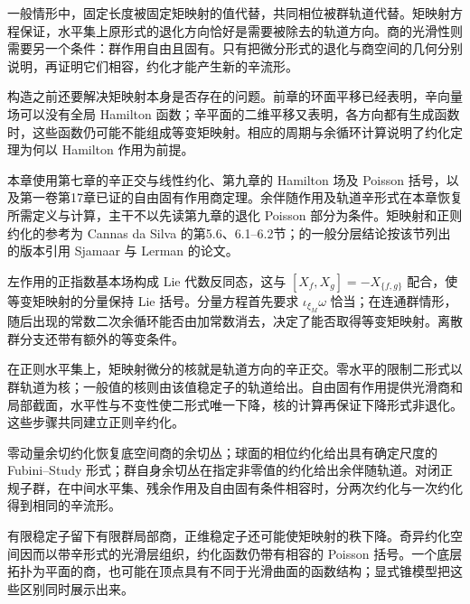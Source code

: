 \ProseParagraphBreak

一般情形中，固定长度被固定矩映射的值代替，共同相位被群轨道代替。矩映射方程保证，水平集上原形式的退化方向恰好是需要被除去的轨道方向。商的光滑性则需要另一个条件：群作用自由且固有。只有把微分形式的退化与商空间的几何分别说明，再证明它们相容，约化才能产生新的辛流形。

\ProseParagraphBreak

构造之前还要解决矩映射本身是否存在的问题。前章的环面平移已经表明，辛向量场可以没有全局 Hamilton 函数；辛平面的二维平移又表明，各方向都有生成函数时，这些函数仍可能不能组成等变矩映射。相应的周期与余循环计算说明了约化定理为何以 Hamilton 作用为前提。

\ProseParagraphBreak

本章使用第七章的辛正交与线性约化、第九章的 Hamilton 场及 Poisson 括号，以及第一卷第17章已证的自由固有作用商定理。余伴随作用及轨道辛形式在本章恢复所需定义与计算，主干不以先读第九章的退化 Poisson 部分为条件。矩映射和正则约化的参考为 Cannas da Silva 的第5.6、6.1–6.2节；的一般分层结论按该节列出的版本引用 Sjamaar 与 Lerman 的论文。\cite[第153--157、160--165页]{Cannas2006Symplectic}






\begin{chaptersummary}
左作用的正指数基本场构成 Lie 代数反同态，这与 \([X_f,X_g]=-X_{\{f,g\}}\) 配合，使等变矩映射的分量保持 Lie 括号。分量方程首先要求 \(\iota_{\xi_M}\omega\) 恰当；在连通群情形，随后出现的常数二次余循环能否由加常数消去，决定了能否取得等变矩映射。离散群分支还带有额外的等变条件。

\ProseParagraphBreak

在正则水平集上，矩映射微分的核就是轨道方向的辛正交。零水平的限制二形式以群轨道为核；一般值的核则由该值稳定子的轨道给出。自由固有作用提供光滑商和局部截面，水平性与不变性使二形式唯一下降，核的计算再保证下降形式非退化。这些步骤共同建立正则辛约化。

\ProseParagraphBreak

零动量余切约化恢复底空间商的余切丛；球面的相位约化给出具有确定尺度的 Fubini--Study 形式；群自身余切丛在指定非零值的约化给出余伴随轨道。对闭正规子群，在中间水平集、残余作用及自由固有条件相容时，分两次约化与一次约化得到相同的辛流形。

\ProseParagraphBreak

有限稳定子留下有限群局部商，正维稳定子还可能使矩映射的秩下降。奇异约化空间因而以带辛形式的光滑层组织，约化函数仍带有相容的 Poisson 括号。一个底层拓扑为平面的商，也可能在顶点具有不同于光滑曲面的函数结构；显式锥模型把这些区别同时展示出来。
\end{chaptersummary}

